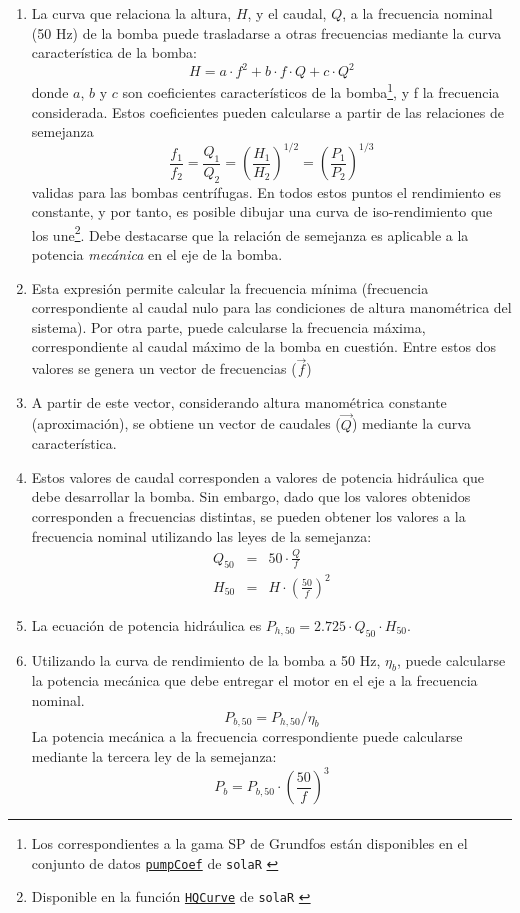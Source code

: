 \begin{enumerate}
\item La curva que relaciona la altura, $H$, y el caudal, $Q$, a la frecuencia
nominal (50 Hz) de la bomba puede trasladarse a otras frecuencias
mediante la curva característica de la bomba: \[
H=a\cdot f^2+b\cdot f\cdot Q+c\cdot Q^2\]
donde $a$, $b$ y $c$ son coeficientes característicos de la
bomba\footnote{Los correspondientes a la gama SP de Grundfos están disponibles en el conjunto de datos \href{http://search.r-project.org/R/library/solaR/html/pumpCoef.html}{\texttt{pumpCoef}}
  de \texttt{solaR} \cite{Perpinan2012b}},
y f la frecuencia considerada. Estos coeficientes pueden calcularse
a partir de las relaciones de semejanza\[
\frac{f_{1}}{f_{2}}=\frac{Q_{1}}{Q_{2}}=\left(\frac{H_{1}}{H_{2}}\right)^{1/2}=\left(\frac{P_{1}}{P_{2}}\right)^{1/3}\]
 validas para las bombas centrífugas. En todos estos puntos el rendimiento
es constante, y por tanto, es posible dibujar una curva de iso-rendimiento
que los une\footnote{Disponible en la función
  \href{http://search.r-project.org/R/library/solaR/html/HQCurve.html}{\texttt{HQCurve}}
  de \texttt{solaR} \cite{Perpinan2012b}}. 
Debe destacarse que la relación de semejanza es aplicable
a la potencia \emph{mecánica} en el eje de la bomba.
\item Esta expresión permite calcular la frecuencia mínima (frecuencia correspondiente
al caudal nulo para las condiciones de altura manométrica del sistema).
Por otra parte, puede calcularse la frecuencia máxima, correspondiente
al caudal máximo de la bomba en cuestión. Entre estos dos valores
se genera un vector de frecuencias ($\vec{f}$)
\item A partir de este vector, considerando altura manométrica constante
(aproximación), se obtiene un vector de caudales ($\vec{Q}$) mediante
la curva característica.
\item Estos valores de caudal corresponden a valores de potencia hidráulica
que debe desarrollar la bomba. Sin embargo, dado que los valores obtenidos
corresponden a frecuencias distintas, se pueden obtener los valores
a la frecuencia nominal utilizando las leyes de la semejanza:\begin{eqnarray*}
Q_{50} & = & 50\cdot\frac{Q}{f}\\
H_{50} & = & H\cdot\left(\frac{50}{f}\right)^{2}\end{eqnarray*}

\item La ecuación de potencia hidráulica es $P_{h,50}=2.725\cdot Q_{50}\cdot H_{50}$. 
\item Utilizando la curva de rendimiento de la bomba a 50 Hz, $\eta_{b}$,
puede calcularse la potencia mecánica que debe entregar el motor en
el eje a la frecuencia nominal.\[
P_{b,50}=P_{h,50}/\eta_{b}\]
 La potencia mecánica a la frecuencia correspondiente puede calcularse
mediante la tercera ley de la semejanza:\[
P_{b}=P_{b,50}\cdot\left(\frac{50}{f}\right)^{3}\]


\end{enumerate}
